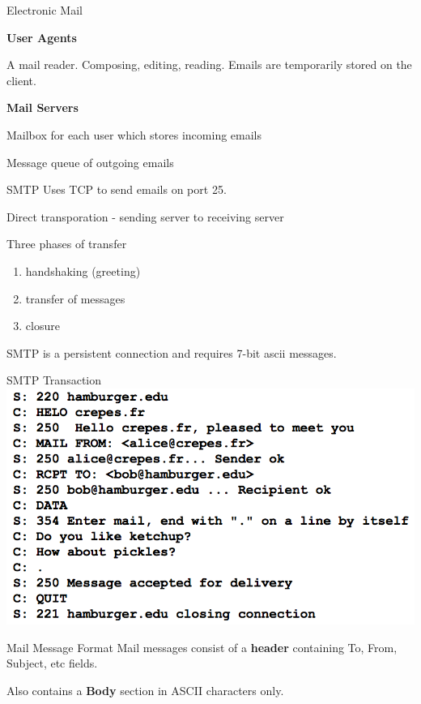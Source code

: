 \begin{topic}{Electronic Mail}

\textbf{User Agents}

A mail reader. 
Composing, editing, reading.
Emails are temporarily stored on the client.

\textbf{Mail Servers}

Mailbox for each user which stores incoming emails

Message queue of outgoing emails

\end{topic}

\begin{topic}{SMTP}
Uses TCP to send emails on port 25.

Direct transporation - sending server to receiving server

Three phases of transfer
\begin{enumerate}
	\item handshaking (greeting)
	\item transfer of messages
	\item closure
\end{enumerate}

SMTP is a persistent connection and requires 7-bit ascii messages.
\end{topic}

\begin{topic}{SMTP Transaction}
\includegraphics[scale=0.35]{coms3200/images/smtp}
\end{topic}

\begin{topic}{Mail Message Format}
Mail messages consist of a \textbf{header} containing To, From, Subject, etc fields.

Also contains a \textbf{Body} section in ASCII characters only.
\end{topic}

